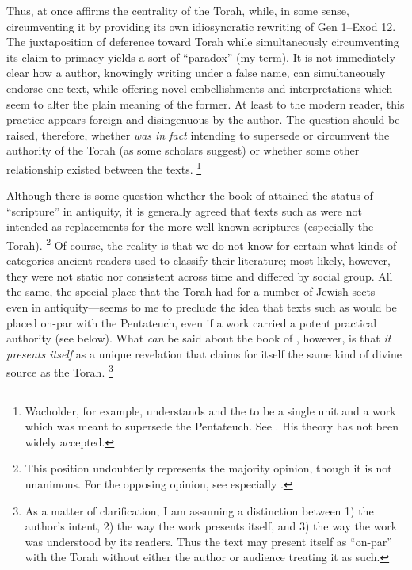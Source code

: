 
\noindent
Thus, \jub at once affirms the centrality of the Torah, while, in some sense, circumventing it by providing its own idiosyncratic rewriting of Gen 1--Exod 12. The juxtaposition of deference toward Torah while simultaneously circumventing its claim to primacy yields a sort of ``\psgraphical paradox'' (my term). It is not immediately clear how a \psgraphical author, knowingly writing under a false name, can simultaneously endorse one text, while offering novel embellishments and interpretations which seem to alter the plain meaning of the former. At least to the modern reader, this practice appears foreign and disingenuous by the \psgraphical author. The question should be raised, therefore, whether \jub \emph{was in fact} intending to supersede or circumvent the authority of the Torah (as some scholars suggest) or whether some other relationship existed between the texts.%
    \footnote{Wacholder, for example, understands \jub and the \templescroll to be a single unit and a work which was meant to supersede the Pentateuch. See \cite{wacholder_kampen-etal1997}. His theory has not been widely accepted.}

Although there is some question whether the book of \jub attained the status of ``scripture'' in antiquity, it is generally agreed that \psgraphical texts such as \jub were not intended as replacements for the more well-known scriptures (especially the Torah).%
    \footnote{This position undoubtedly represents the majority opinion, though it is not unanimous. For the opposing opinion, see especially \cite{wacholder_kampen-etal1997}.}
Of course, the reality is that we do not know for certain what kinds of categories ancient readers used to classify their literature; most likely, however, they were not static nor consistent across time and differed by social group. All the same, the special place that the Torah had for a number of Jewish sects---even in antiquity---seems to me to preclude the idea that \psgraphical texts such as \jub would be placed on-par with the Pentateuch, even if a work carried a potent practical authority (see below). What \emph{can} be said about the book of \jub, however, is that \emph{it presents itself} as a unique revelation that claims for itself the same kind of divine source as the Torah.%
    \footnote{As a matter of clarification, I am assuming a distinction between 1) the author's intent, 2) the way the work presents itself, and 3) the way the work was understood by its readers. Thus the text may present itself as ``on-par'' with the Torah without either the author or audience treating it as such.}

